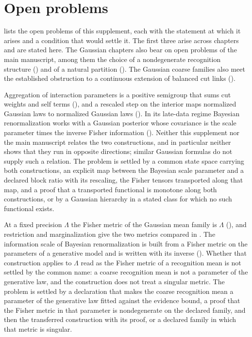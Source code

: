 \section{Open problems}
\label{sec:grg-obligations}

 lists the open problems of this supplement, each with the statement at which
it arises and a condition that would settle it. The first three arise across chapters and are stated
here. The Gaussian chapters also bear on open problems of the main manuscript, among them the choice
of a nondegenerate recognition structure () and of a natural
partition (). The Gaussian coarse families also meet the established
obstruction to a continuous extension of balanced cut links ().

Aggregation of interaction parameters is a positive semigroup that sums cut weights and self terms
(), and a rescaled step on the interior maps normalized Gaussian
laws to normalized Gaussian laws (). In its late-data regime Bayesian
renormalization works with a Gaussian posterior whose covariance is the scale parameter times the
inverse Fisher information (). Neither this supplement nor the main
manuscript relates the two constructions, and in particular neither shows that they run in opposite
directions; similar Gaussian formulas do not supply such a relation. The problem is settled by a common state space carrying both
constructions, an explicit map between the Bayesian scale parameter and a declared block ratio with
its rescaling, the Fisher tensors transported along that map, and a proof that a transported
functional is monotone along both constructions, or by a Gaussian hierarchy in a stated class for
which no such functional exists.

At a fixed precision \(\Lambda\) the Fisher metric of the Gaussian mean family is \(\Lambda\)
(), and restriction and marginalization give the two metrics compared
in . The information scale of Bayesian renormalization is built
from a Fisher metric on the parameters of a generative model and is written with its inverse
(). Whether that construction applies to \(\Lambda\) read as the
Fisher metric of a recognition mean is not settled by the common name: a coarse recognition mean is not
a parameter of the generative law, and the construction does not treat a singular metric. The problem is settled by a declaration that
makes the coarse recognition mean a parameter of the generative law fitted against the evidence bound,
a proof that the Fisher metric in that parameter is nondegenerate on the declared family, and then the
transferred construction with its proof, or a declared family in which that metric is singular.

